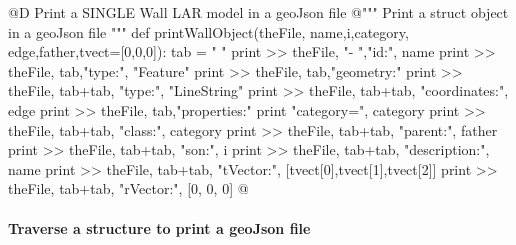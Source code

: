 \documentclass[11pt,oneside]{article}	%
\begin{document}
@D Print a SINGLE Wall LAR model  in a geoJson file
@{""" Print a struct object in a geoJson file """
def printWallObject(theFile, name,i,category, edge,father,tvect=[0,0,0]):
    tab = "    "
    print >> theFile, "-   ","id:", name
    print >> theFile, tab,"type:", "Feature"
    print >> theFile, tab,"geometry:" 
    print >> theFile, tab+tab, "type:", "LineString"
    print >> theFile, tab+tab, "coordinates:", edge
    print >> theFile, tab,"properties:"
    print "category=", category
    print >> theFile, tab+tab, "class:", category
    print >> theFile, tab+tab, "parent:", father
    print >> theFile, tab+tab, "son:", i
    print >> theFile, tab+tab, "description:", name
    print >> theFile, tab+tab, "tVector:", [tvect[0],tvect[1],tvect[2]]
    print >> theFile, tab+tab, "rVector:", [0, 0, 0]
@}



\paragraph{Traverse a structure to print a geoJson file}
\end{document}

